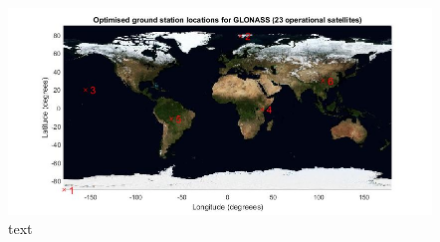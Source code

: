 \documentclass[Space3_Assign2]{subfile}
\begin{document}
\begin{figure}
\centering
\caption{text}
\label{GSloc}
\includegraphics[width = \linewidth]{./GSLocations.jpg}
\end{figure}
\end{document}
